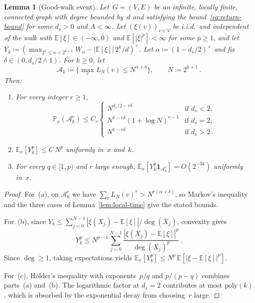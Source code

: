 \documentclass[aop]{imsart}
\theoremstyle{plain}
\newtheorem{lemma}[theorem]{Lemma}
\theoremstyle{definition}
\newcommand{\E}{\mathbb{E}}
\renewcommand{\P}{\mathbb{P}}
\newcommand{\one}{\mathbf{1}}
\begin{document}
	\begin{lemma}[Good-walk event]\label{lem:good-walk}
		Let~$G = (V,E)$ be an infinite, locally finite, connected graph with degree bounded by~$d$ and satisfying the bound~\eqref{eq:return-bound} for some $d_s>0$ and $A<\infty$. Let $(\xi(v))_{v\in V}$ be i.i.d.\ and independent of the walk with $\E[\xi]\in(-\infty,0)$ and $\E[|\xi|^p]<\infty$ for some $p\geq 1$, and let $Y_k\coloneqq(\max_{2^k\leq n<2^{k+1}}W_n-|\E[\xi]|\,2^k/d)^+$. Let $\alpha\coloneqq(1-d_s/2)^+$ and fix $\delta\in(0,d_s/2\wedge 1)$. For $k\geq 0$, let
		\begin{equation}
			\mathcal{A}_k\coloneqq\bigl\{\max_v L_N(v)\leq N^{\alpha+\delta}\bigr\},\qquad N\coloneqq 2^{k+1}\,.
		\end{equation}
		Then:
		\begin{enumerate}[label=\textup{(\alph*)}]
			\item For every integer $r\geq 1$,
			\[
			\P_x(\mathcal{A}_k^c)\leq C_r\begin{cases}
				N^{d_s/2-r\delta} & \text{if } d_s<2,\\[3pt]
				N^{1-r\delta}(1{+}\log N)^{r-1} & \text{if } d_s=2,\\[3pt]
				N^{1-r\delta} & \text{if } d_s>2\,.
			\end{cases}\,
			\]
			\item $\E_x[Y_k^p]\leq C\,N^p$ uniformly in~$x$ and~$k$.
			\item For every $q\in[1,p)$ and $r$ large enough, $\E_x[Y_k^q\one_{\mathcal{A}_k^c}]=O(2^{-3k})$ uniformly in~$x$.
		\end{enumerate}
	\end{lemma}
	\begin{proof}
		For~(a), on $\mathcal{A}_k^c$ we have $\sum_v L_N(v)^r>N^{r(\alpha+\delta)}$, so Markov's inequality and the three cases of Lemma~\ref{lem:local-time} give the stated bounds.
		
		For~(b), since $Y_k\leq\sum_{j=0}^{N-1}|\xi(X_j)-\E[\xi]|/\deg(X_j)$, convexity gives
		\[
		Y_k^p\leq N^{p-1}\sum_{j=0}^{N-1}\frac{|\xi(X_j)-\E[\xi]|^p}{\deg(X_j)^p}\,.
		\]
		Since $\deg\geq 1$, taking expectations yields $\E_x[Y_k^p]\leq N^p\,\E[|\xi-\E[\xi]|^p]$.
		
		For~(c), H\"older's inequality with exponents~$p/q$ and $p/(p{-}q)$ combines parts~(a) and~(b). The logarithmic factor at $d_s=2$ contributes at most $\mathrm{poly}(k)$, which is absorbed by the exponential decay from choosing~$r$ large.
	\end{proof}
	
\end{document}
